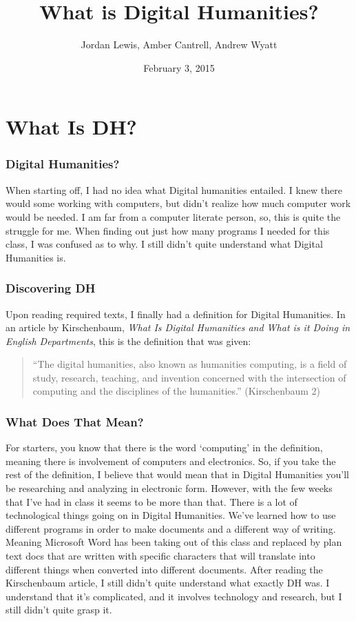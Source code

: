\documentclass[]{article}
\title{What is Digital Humanities?}
\author{Jordan Lewis, Amber Cantrell, Andrew Wyatt}
\date{February 3, 2015}
\begin{document}
\maketitle

\section{What Is DH?}\label{what-is-dh}

\subsubsection{Digital Humanities?}\label{digital-humanities}

When starting off, I had no idea what Digital humanities entailed. I
knew there would some working with computers, but didn't realize how
much computer work would be needed. I am far from a computer literate
person, so, this is quite the struggle for me. When finding out just how
many programs I needed for this class, I was confused as to why. I still
didn't quite understand what Digital Humanities is.

\subsubsection{Discovering DH}\label{discovering-dh}

Upon reading required texts, I finally had a definition for Digital
Humanities. In an article by Kirschenbaum, \emph{What Is Digital
Humanities and What is it Doing in English Departments}, this is the
definition that was given:

\begin{quote}
``The digital humanities, also known as humanities computing, is a field
of study, research, teaching, and invention concerned with the
intersection of computing and the disciplines of the humanities.''
(Kirschenbaum 2)
\end{quote}

\subsubsection{What Does That Mean?}\label{what-does-that-mean}

For starters, you know that there is the word `computing' in the
definition, meaning there is involvement of computers and electronics.
So, if you take the rest of the definition, I believe that would mean
that in Digital Humanities you'll be researching and analyzing in
electronic form. However, with the few weeks that I've had in class it
seems to be more than that. There is a lot of technological things going
on in Digital Humanities. We've learned how to use different programs in
order to make documents and a different way of writing. Meaning
Microsoft Word has been taking out of this class and replaced by plan
text docs that are written with specific characters that will translate
into different things when converted into different documents. After
reading the Kirschenbaum article, I still didn't quite understand what
exactly DH was. I understand that it's complicated, and it involves
technology and research, but I still didn't quite grasp it.
\end{document}
